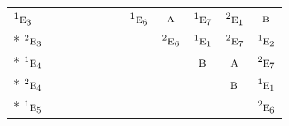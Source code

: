 \documentclass[10pt,a4paper]{article}
\numberwithin{equation}{section}
\newcommand{\irr}[1]{\text{\normalfont\scshape #1}}
\newcommand{\conjpair}[1]{{}^{#1}}
\begin{document}
{\begin{longtable}{@{}lccccccccccc@{}}
$\conjpair{1}\irr{e}_{3}$ &  &  &  &  &  &  & $\conjpair{1}\irr{e}_{6}$ & $\irr{a}$ & $\conjpair{1}\irr{e}_{7}$ & $\conjpair{2}\irr{e}_{1}$ & $\irr{b}$\\*
$\conjpair{2}\irr{e}_{3}$ &  &  &  &  &  &  &  & $\conjpair{2}\irr{e}_{6}$ & $\conjpair{1}\irr{e}_{1}$ & $\conjpair{2}\irr{e}_{7}$ & $\conjpair{1}\irr{e}_{2}$\\*
$\conjpair{1}\irr{e}_{4}$ &  &  &  &  &  &  &  &  & $\irr{b}$ & $\irr{a}$ & $\conjpair{2}\irr{e}_{7}$\\*
$\conjpair{2}\irr{e}_{4}$ &  &  &  &  &  &  &  &  &  & $\irr{b}$ & $\conjpair{1}\irr{e}_{1}$\\*
$\conjpair{1}\irr{e}_{5}$ &  &  &  &  &  &  &  &  &  &  & $\conjpair{2}\irr{e}_{6}$\\
\bottomrule\end{longtable}}
\end{document}
